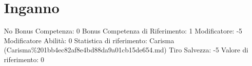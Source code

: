 \section{Inganno}\label{inganno}

\begin{description}
\tightlist
\item[Tags: ABI]
No Bonus Competenza: 0 Bonus Competenza di Riferimento: 1 Modificatore:
-5 Modificatore Abilità: 0 Statistica di riferimento: Carisma
(Carisma\%201bb4ec82af8e4bd88da9a01cb15de654.md) Tiro Salvezza: -5
Valore di riferimento: 0
\end{description}
